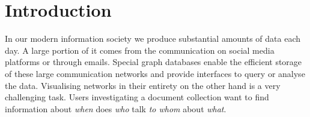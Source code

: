 \section{Introduction}


In our modern information society we produce substantial amounts of data each day.
A large portion of it comes from the communication on social media platforms or through emails.
Special graph databases enable the efficient storage of these large communication networks and provide interfaces to query or analyse the data.
Visualising networks in their entirety on the other hand is a very challenging task.
Users investigating a document collection want to find information about \textit{when} does \textit{who} talk \textit{to whom} about \textit{what}.

